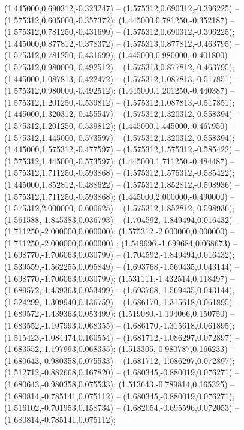  (1.445000,0.690312,-0.323247) -- (1.575312,0.690312,-0.396225) -- (1.575312,0.605000,-0.357372);
 (1.445000,0.781250,-0.352187) -- (1.575312,0.781250,-0.431699) -- (1.575312,0.690312,-0.396225);
 (1.445000,0.877812,-0.378372) -- (1.575313,0.877812,-0.463795) -- (1.575312,0.781250,-0.431699);
 (1.445000,0.980000,-0.401800) -- (1.575312,0.980000,-0.492512) -- (1.575313,0.877812,-0.463795);
 (1.445000,1.087813,-0.422472) -- (1.575312,1.087813,-0.517851) -- (1.575312,0.980000,-0.492512);
 (1.445000,1.201250,-0.440387) -- (1.575312,1.201250,-0.539812) -- (1.575312,1.087813,-0.517851);
 (1.445000,1.320312,-0.455547) -- (1.575312,1.320312,-0.558394) -- (1.575312,1.201250,-0.539812);
 (1.445000,1.445000,-0.467950) -- (1.575312,1.445000,-0.573597) -- (1.575312,1.320312,-0.558394);
 (1.445000,1.575312,-0.477597) -- (1.575312,1.575312,-0.585422) -- (1.575312,1.445000,-0.573597);
 (1.445000,1.711250,-0.484487) -- (1.575312,1.711250,-0.593868) -- (1.575312,1.575312,-0.585422);
 (1.445000,1.852812,-0.488622) -- (1.575312,1.852812,-0.598936) -- (1.575312,1.711250,-0.593868);
 (1.445000,2.000000,-0.490000) -- (1.575312,2.000000,-0.600625) -- (1.575312,1.852812,-0.598936);
 (1.561588,-1.845383,0.036793) -- (1.704592,-1.849494,0.016432) -- (1.711250,-2.000000,0.000000);
 (1.575312,-2.000000,0.000000) -- (1.711250,-2.000000,0.000000) ;
 (1.549696,-1.699684,0.068673) -- (1.698770,-1.706063,0.030799) -- (1.704592,-1.849494,0.016432);
 (1.539559,-1.562255,0.095849) -- (1.693768,-1.569435,0.043144) -- (1.698770,-1.706063,0.030799);
 (1.531111,-1.432514,0.118497) -- (1.689572,-1.439363,0.053499) -- (1.693768,-1.569435,0.043144);
 (1.524299,-1.309940,0.136759) -- (1.686170,-1.315618,0.061895) -- (1.689572,-1.439363,0.053499);
 (1.519080,-1.194066,0.150750) -- (1.683552,-1.197993,0.068355) -- (1.686170,-1.315618,0.061895);
 (1.515423,-1.084474,0.160554) -- (1.681712,-1.086297,0.072897) -- (1.683552,-1.197993,0.068355);
 (1.513305,-0.980787,0.166233) -- (1.680643,-0.980358,0.075533) -- (1.681712,-1.086297,0.072897);
 (1.512712,-0.882668,0.167820) -- (1.680345,-0.880019,0.076271) -- (1.680643,-0.980358,0.075533);
 (1.513643,-0.789814,0.165325) -- (1.680814,-0.785141,0.075112) -- (1.680345,-0.880019,0.076271);
 (1.516102,-0.701953,0.158734) -- (1.682054,-0.695596,0.072053) -- (1.680814,-0.785141,0.075112);
